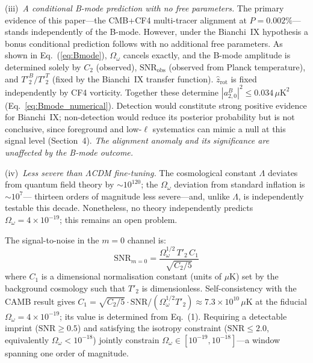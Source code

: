 \documentclass[12pt]{article}
\begin{document}
(iii)~\emph{A conditional B-mode prediction with no free parameters.}
The primary evidence of this paper---the CMB+CF4 multi-tracer alignment at
$P=0.002\%$---stands independently of the B-mode.
However, under the Bianchi~IX hypothesis a bonus conditional prediction
follows with no additional free parameters.
As shown in Eq.~(\ref{eq:Bmode}), $\Omega_\omega$ cancels exactly, and the
B-mode amplitude is determined solely by $C_2$ (observed), $\mathrm{SNR}_\mathrm{obs}$
(observed from Planck temperature), and $T'^B_2/T'^T_2$ (fixed by the
Bianchi~IX transfer function).
$\hat{z}_\mathrm{rot}$ is fixed independently by CF4 vorticity.
Together these determine $|a^B_{2,0}|^2\leq0.034\,\mu\mathrm{K}^2$
(Eq.~\ref{eq:Bmode_numerical}).
Detection would constitute strong positive evidence for Bianchi~IX;
non-detection would reduce its posterior probability but is not conclusive,
since foreground and low-$\ell$ systematics can mimic a null at this
signal level (Section~4).
\emph{The alignment anomaly and its significance are unaffected by the
B-mode outcome.}

(iv)~\emph{Less severe than $\Lambda$CDM fine-tuning.}
The cosmological constant $\Lambda$ deviates from quantum field theory by
$\sim10^{120}$; the $\Omega_\omega$ deviation from standard inflation is $\sim10^7$---
thirteen orders of magnitude less severe---and, unlike $\Lambda$, is independently
testable this decade.
Nonetheless, no theory independently predicts $\Omega_\omega=4\times10^{-19}$;
this remains an open problem.

The signal-to-noise in the $m=0$ channel is:
\begin{equation}
  \mathrm{SNR}_{m=0} = \frac{\Omega_\omega^{1/2}\,T'_2\,C_1}{\sqrt{C_2/5}}
\end{equation}
where $C_1$ is a dimensional normalisation constant (units of $\mu$K) set by the
background cosmology such that $T'_2$ is dimensionless.
Self-consistency with the CAMB result gives
$C_1=\sqrt{C_2/5}\cdot\mathrm{SNR}/(\Omega_\omega^{1/2}T'_2)\approx7.3\times10^{10}\,\mu\mathrm{K}$
at the fiducial $\Omega_\omega=4\times10^{-19}$; its value is determined from
Eq.~(1). Requiring a detectable imprint ($\mathrm{SNR}\geq0.5$) and satisfying the
isotropy constraint ($\mathrm{SNR}\leq2.0$, equivalently $\Omega_\omega<10^{-18}$)
jointly constrain $\Omega_\omega\in[10^{-19},10^{-18}]$---a window spanning one
order of magnitude.
\end{document}

